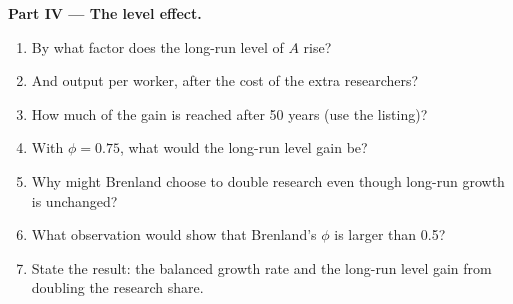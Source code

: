 \begin{problem}
\medskip
\noindent\textbf{Part IV --- The level effect.}
\begin{enumerate}[resume]
  \item By what factor does the long-run level of $A$ rise?
  \item And output per worker, after the cost of the extra researchers?
  \item How much of the gain is reached after 50 years (use the listing)?
  \item With $\phi = 0.75$, what would the long-run level gain be?
  \item Why might Brenland choose to double research even though long-run growth is unchanged?
  \item What observation would show that Brenland's $\phi$ is larger than 0.5?
  \item State the result: the balanced growth rate and the long-run level gain from doubling the research share.
\end{enumerate}
\end{problem}
